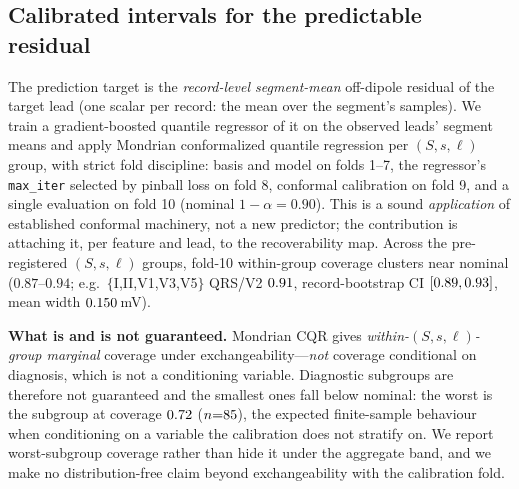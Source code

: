 \subsection{Calibrated intervals for the predictable residual}
The prediction target is the \emph{record-level segment-mean} off-dipole residual of the target
lead (one scalar per record: the mean over the segment's samples). We train a gradient-boosted
quantile regressor of it on the observed leads' segment means and apply Mondrian conformalized
quantile regression \cite{romano2019cqr} per $(S,s,\ell)$ group, with strict fold discipline:
basis and model on folds 1--7, the regressor's \texttt{max\_iter} selected by pinball loss on
fold 8, conformal calibration on fold 9, and a single evaluation on fold 10 (nominal
$1{-}\alpha{=}0.90$). This is a sound \emph{application} of established conformal machinery, not
a new predictor; the contribution is attaching it, per feature and lead, to the recoverability
map. Across the pre-registered $(S,s,\ell)$ groups, fold-10 within-group
coverage clusters near nominal ($0.87$--$0.94$; e.g.\ $\{$I,II,V1,V3,V5$\}$ QRS/V2
$0.91$, record-bootstrap CI $[0.89,0.93]$, mean width $0.150$\,mV).

\textbf{What is and is not guaranteed.} Mondrian CQR gives \emph{within-$(S,s,\ell)$-group
marginal} coverage under exchangeability---\emph{not} coverage conditional on diagnosis, which
is not a conditioning variable. Diagnostic subgroups are therefore not guaranteed and the
smallest ones fall below nominal: the worst is the \WorstSubName{} subgroup at coverage
$0.72$ ($n{=}85$), the expected finite-sample behaviour when conditioning on
a variable the calibration does not stratify on. We report worst-subgroup coverage rather than
hide it under the aggregate band, and we make no distribution-free claim beyond exchangeability
with the calibration fold.